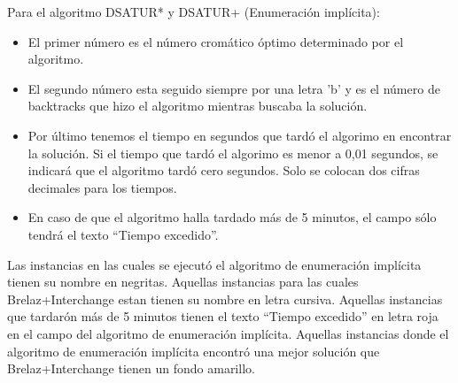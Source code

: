 \documentclass[a4paper,10pt]{article}
\begin{document}
\indent Para el algoritmo DSATUR* y DSATUR+ (Enumeraci\'on impl\'icita):
\begin{itemize}
 \item El primer n\'umero es el n\'umero crom\'atico \'optimo
       determinado por el algoritmo.
 \item El segundo n\'umero esta seguido siempre por una letra 'b' y es
       el n\'umero de backtracks que hizo el algoritmo mientras buscaba
       la soluci\'on.
 \item Por \'ultimo tenemos el tiempo en segundos que tard\'o el algorimo en
       encontrar la soluci\'on. Si el tiempo que tard\'o el algorimo es
       menor a 0,01 segundos, se indicar\'a que el algoritmo tard\'o
       cero segundos. Solo se colocan dos cifras decimales para los
       tiempos.
 \item En caso de que el algoritmo halla tardado m\'as de 5 minutos, el
       campo s\'olo tendr\'a el texto ``Tiempo excedido''.
\end{itemize}

\indent Las instancias en las cuales se ejecut\'o el algoritmo de
enumeraci\'on impl\'icita tienen su nombre en negritas.
\indent Aquellas instancias para las cuales Brelaz+Interchange estan
tienen su nombre en letra cursiva.
\indent Aquellas instancias que tardar\'on m\'as de 5 minutos tienen el
texto ``Tiempo excedido'' en letra roja en el campo del algoritmo de
enumeraci\'on impl\'icita.
\indent Aquellas instancias donde el algoritmo de enumeraci\'on
impl\'icita encontr\'o una mejor soluci\'on que Brelaz+Interchange
tienen un fondo amarillo.
\end{document}
